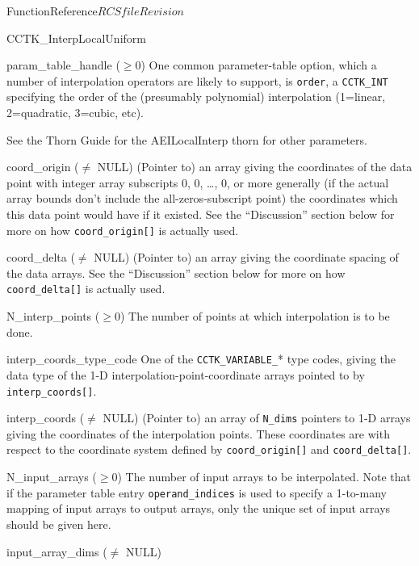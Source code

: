 \begin{cactuspart}{FunctionReference}{$RCSfile$}{$Revision$}
\begin{FunctionDescription}{CCTK\_InterpLocalUniform}
\begin{ParameterSection}
\begin{Parameter}{param\_table\_handle ($\ge 0$)}
One common parameter-table option, which a number of interpolation
operators are likely to support, is \verb|order|, a \verb|CCTK_INT|
specifying the order of the (presumably polynomial) interpolation
(1=linear, 2=quadratic, 3=cubic, etc).

See the Thorn Guide for the AEILocalInterp thorn for other parameters.
\end{Parameter}
\begin{Parameter}{coord\_origin ($\ne$ NULL)}
\hbox{}
(Pointer to) an array giving the coordinates of the data point with
integer array subscripts 0, 0, \dots, 0, or more generally (if the actual
array bounds don't include the all-zeros-subscript point) the coordinates
which this data point would have if it existed.  See the ``Discussion''
section below for more on how \verb|coord_origin[]| is actually used.
\end{Parameter}
\begin{Parameter}{coord\_delta ($\ne$ NULL)}
\hbox{}
(Pointer to) an array giving the coordinate spacing of the data arrays.
See the ``Discussion'' section below for more on how \verb|coord_delta[]|
is actually used.
\end{Parameter}
\begin{Parameter}{N\_interp\_points ($\ge 0$)}
\hbox{}
The number of points at which interpolation is to be done.
\end{Parameter}
\begin{Parameter}{interp\_coords\_type\_code}
\hbox{}
One of the \verb|CCTK_VARIABLE_|* type codes, giving the data type
of the 1-D interpolation-point-coordinate arrays pointed to by
\verb|interp_coords[]|.
\end{Parameter}
\begin{Parameter}{interp\_coords ($\ne$ NULL)}
\hbox{}
(Pointer to) an array of \verb|N_dims| pointers to 1-D arrays giving the
coordinates of the interpolation points.  These coordinates are with
respect to the coordinate system defined by \verb|coord_origin[]| and
\verb|coord_delta[]|.
\end{Parameter}
\begin{Parameter}{N\_input\_arrays ($\ge 0$)}
\hbox{}
The number of input arrays to be interpolated.
Note that if the parameter table entry \verb|operand_indices|
is used to specify a 1-to-many mapping of input arrays to output arrays,
only the unique set of input arrays should be given here.
\end{Parameter}
\begin{Parameter}{input\_array\_dims ($\ne$ NULL)}

\end{Parameter}
\end{ParameterSection}
\end{FunctionDescription}
\end{cactuspart}
